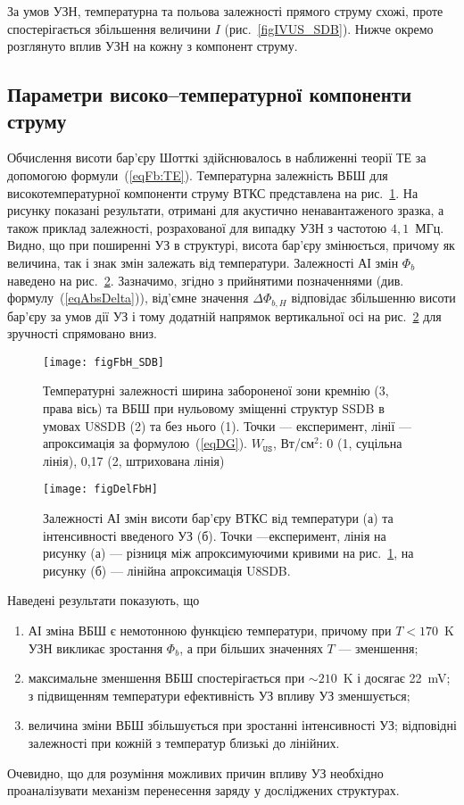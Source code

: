 За умов УЗН, температурна та польова залежності прямого струму схожі,
проте спостерігається збільшення величини $I$ (рис.~\ref{figIVUS_SDB}).
Нижче окремо розглянуто вплив УЗН на кожну з компонент струму.


\subsection{Параметри високо--температурної компоненти струму}

Обчислення висоти бар'єру Шотткі здійснювалось в наближенні теорії ТЕ за допомогою формули~(\ref{eqFb:TE}).
Температурна залежність ВБШ для високотемпературної компоненти струму ВТКС представлена на рис.~\ref{figFbH_SDB}.
На рисунку показані результати, отримані для акустично ненавантаженого зразка,
а також приклад залежності, розрахованої для випадку УЗН з частотою $4,1$~МГц.
Видно, що при поширенні УЗ в структурі, висота бар'єру змінюється,
причому як величина, так і знак змін залежать від температури.
Залежності АІ змін $\Phi_{b}$ наведено на рис.~\ref{figDelFbH}.
Зазначимо, згідно з прийнятими позначеннями (див. формулу~(\ref{eqAbsDelta})),
від'ємне значення $\Delta \Phi_{b,H}$ відповідає збільшенню висоти бар'єру за умов дії УЗ і тому
додатній напрямок вертикальної осі на рис.~\ref{figDelFbH} для зручності спрямовано вниз.



\begin{figure}
\center
\texttt{[image: figFbH\_SDB]}
\caption{\label{figFbH_SDB}
Температурні залежності ширина забороненої зони кремнію (3, права вісь)
та ВБШ при нульовому зміщенні структур SSDB в умовах U8SDB (2) та без нього (1).
Точки --- експеримент,
лінії --- апроксимація за формулою~(\ref{eqDG}).
$W_\mathtt{US}$,  Вт/см$^2$: 0 (1, суцільна лінія), 0,17 (2, штрихована лінія)
}%
\end{figure}


\begin{figure}
\center
\texttt{[image: figDelFbH]}
\caption{\label{figDelFbH}
Залежності АІ змін висоти бар'єру ВТКС від температури (а) та інтенсивності введеного УЗ (б).
Точки ---експеримент,
лінія на рисунку (а) --- різниця між апроксимуючими кривими на рис.~\ref{figFbH_SDB},
на рисунку (б) --- лінійна апроксимація
U8SDB.
}%
\end{figure}

Наведені результати показують, що
\begin{enumerate}[label=\asbuk*),leftmargin=0em,itemindent=1.5em]
\item АІ зміна ВБШ є немотонною функцією температури, причому при $T<170$~K УЗН викликає зростання $\Phi_b$,
а при більших значеннях $T$ --- зменшення;
\item максимальне зменшення ВБШ спостерігається при $\sim210$~K і досягає 22~mV;
з підвищенням температури ефективність УЗ впливу УЗ зменшується;
\item величина зміни ВБШ збільшується при зростанні інтенсивності УЗ; відповідні залежності при кожній з температур
близькі до лінійних.
\end{enumerate}
Очевидно, що для розуміння можливих причин впливу УЗ необхідно проаналізувати механізм перенесення заряду
у досліджених структурах.

